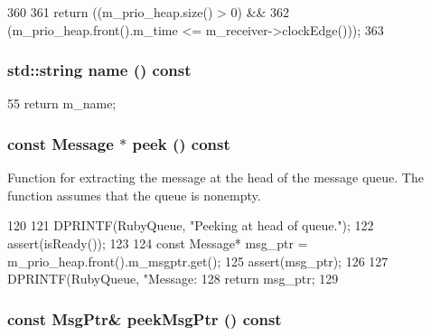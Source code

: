 \begin{DoxyCode}
360 {
361     return ((m_prio_heap.size() > 0) &&
362             (m_prio_heap.front().m_time <= m_receiver->clockEdge()));
363 }
\end{DoxyCode}
\hypertarget{classMessageBuffer_a37627d5d5bba7f4a8690c71c2ab3cb07}{
\subsubsection[{name}]{\setlength{\rightskip}{0pt plus 5cm}std::string name () const}}
\label{classMessageBuffer_a37627d5d5bba7f4a8690c71c2ab3cb07}



\begin{DoxyCode}
55 { return m_name; }
\end{DoxyCode}
\hypertarget{classMessageBuffer_a5e133f7f4632eccf4bb7145962bc89ca}{
\subsubsection[{peek}]{\setlength{\rightskip}{0pt plus 5cm}const {\bf Message} $\ast$ peek () const}}
\label{classMessageBuffer_a5e133f7f4632eccf4bb7145962bc89ca}
Function for extracting the message at the head of the message queue. The function assumes that the queue is nonempty. 


\begin{DoxyCode}
120 {
121     DPRINTF(RubyQueue, "Peeking at head of queue.\n");
122     assert(isReady());
123 
124     const Message* msg_ptr = m_prio_heap.front().m_msgptr.get();
125     assert(msg_ptr);
126 
127     DPRINTF(RubyQueue, "Message: %
128     return msg_ptr;
129 }
\end{DoxyCode}
\hypertarget{classMessageBuffer_add248ff5db7f0e5dac1501da94c4c83e}{
\subsubsection[{peekMsgPtr}]{\setlength{\rightskip}{0pt plus 5cm}const {\bf MsgPtr}\& peekMsgPtr () const}}
\label{classMessageBuffer_add248ff5db7f0e5dac1501da94c4c83e}



